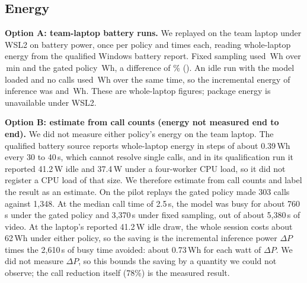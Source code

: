\subsection{Energy}
\label{sec:energy}
\begin{tcolorbox}[colback=red!4,colframe=red!60!black,boxrule=0.5pt,fonttitle=\footnotesize\bfseries,title={Placeholder: Alejandro picks option A or B and deletes the other},fontupper=\small]
\textbf{Option A: team-laptop battery runs.}
We replayed  on the team laptop under WSL2 on battery power, once per policy and  times each, reading whole-laptop energy from the qualified Windows battery report.
Fixed sampling used \,Wh over \,min and the gated policy \,Wh, a difference of \% ().
An idle run with the model loaded and no calls used \,Wh over the same time, so the incremental energy of inference was  and \,Wh.
These are whole-laptop figures; package energy is unavailable under WSL2.

\medskip
\textbf{Option B: estimate from call counts (energy not measured end to end).}
We did not measure either policy's energy on the team laptop.
The qualified battery source reports whole-laptop energy in steps of about 0.39\,Wh every 30 to 40\,s, which cannot resolve single calls, and in its qualification run it reported 41.2\,W idle and 37.4\,W under a four-worker CPU load, so it did not register a CPU load of that size.
We therefore estimate from call counts and label the result as an estimate.
On the pilot replays the gated policy made 303 calls against 1,348.
At the median call time of 2.5\,s, the model was busy for about 760\,s under the gated policy and 3,370\,s under fixed sampling, out of about 5,380\,s of video.
At the laptop's reported 41.2\,W idle draw, the whole session costs about 62\,Wh under either policy, so the saving is the incremental inference power $\Delta P$ times the 2,610\,s of busy time avoided: about 0.73\,Wh for each watt of $\Delta P$.
We did not measure $\Delta P$, so this bounds the saving by a quantity we could not observe; the call reduction itself (78\%) is the measured result.
\end{tcolorbox}
